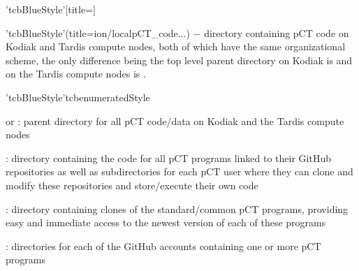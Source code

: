 \begin{tcbfunctionenv}'tcbBlueStyle'[title=]
\begin{tcbparagraph}'tcbBlueStyle'(title=\dirsep ion/local\dirsep pCT\_code\dirsep$\dots$)
$\boldsymbol{-}$ directory containing pCT code on Kodiak and Tardis compute nodes, both of which have the same organizational scheme, the only difference being the top level parent directory on Kodiak is  and on the Tardis compute nodes is .
\end{tcbparagraph}
\begin{tcbparagraph}'tcbBlueStyle'{tcbenumeratedStyle}
\begin{deepList}[labelindent=1pt, leftmargin=*]
	\item {} or  : parent directory for all pCT code/data on Kodiak and the Tardis compute nodes
    	\begin{deepList}[labelindent=1pt, leftmargin=*]
        	\item {} : directory containing the code for all pCT programs linked to their GitHub repositories as well as subdirectories for each pCT user where they can clone and modify these repositories and store/execute their own code
	    	\begin{deepList}[labelindent=1pt, leftmargin=*]
	        	\item {} : directory containing clones of the standard/common pCT programs, providing easy and immediate access to the newest version of each of these programs
	    		\begin{deepList}[labelindent=1pt, leftmargin=*]
	        		\item {} : directories for each of the GitHub accounts containing one or more pCT programs
				\begin{deepList}[labelindent=1pt, leftmargin=*]

\end{deepList}
\end{deepList}
\end{deepList}
\end{deepList}
\end{deepList}
\end{tcbparagraph}
\end{tcbfunctionenv}
